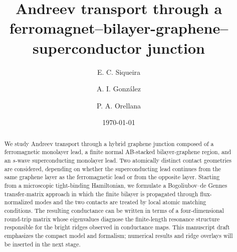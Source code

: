 \documentclass[reprint,amsmath,amssymb,aps,prb]{revtex4-2}
\begin{document}
\title{Andreev transport through a ferromagnet--bilayer-graphene--superconductor junction}
\author{E. C. Siqueira}



\author{A. I. Gonz\'alez}

\author{P. A. Orellana}

\date{\today}

\begin{abstract}
	We study Andreev transport through a hybrid graphene junction composed of a ferromagnetic monolayer lead, a finite normal AB-stacked bilayer-graphene region, and an $s$-wave superconducting monolayer lead.  Two atomically distinct contact geometries are considered, depending on whether the superconducting lead continues from the same graphene layer as the ferromagnetic lead or from the opposite layer.  Starting from a microscopic tight-binding Hamiltonian, we formulate a Bogoliubov--de Gennes transfer-matrix approach in which the finite bilayer is propagated through flux-normalized modes and the two contacts are treated by local atomic matching conditions.  The resulting conductance can be written in terms of a four-dimensional round-trip matrix whose eigenvalues diagnose the finite-length resonance structure responsible for the bright ridges observed in conductance maps.  This manuscript draft emphasizes the compact model and formalism; numerical results and ridge overlays will be inserted in the next stage.
\end{abstract}

\maketitle










\appendix






\end{document}
